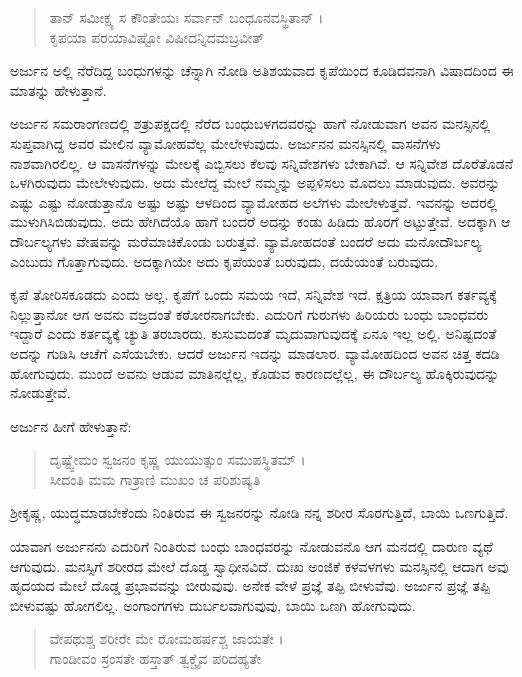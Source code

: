 \begin{verse}
ತಾನ್ ಸಮೀಕ್ಷ್ಯ ಸ ಕೌಂತೇಯಃ ಸರ್ವಾನ್ ಬಂಧೂನವಸ್ಥಿತಾನ್ ।\\ಕೃಪಯಾ ಪರಯಾವಿಷ್ಟೋ ವಿಷೀದನ್ನಿದಮಬ್ರವೀತ್
\end{verse}

{\small ಅರ್ಜುನ ಅಲ್ಲಿ ನೆರೆದಿದ್ದ ಬಂಧುಗಳನ್ನು ಚೆನ್ನಾಗಿ ನೋಡಿ ಅತಿಶಯವಾದ ಕೃಪೆಯಿಂದ ಕೂಡಿದವನಾಗಿ ವಿಷಾದದಿಂದ ಈ ಮಾತನ್ನು ಹೇಳುತ್ತಾನೆ.}

ಅರ್ಜುನ ಸಮರಾಂಗಣದಲ್ಲಿ ಶತ್ರುಪಕ್ಷದಲ್ಲಿ ನೆರೆದ ಬಂಧುಬಳಗದವರನ್ನು ಹಾಗೆ ನೋಡುವಾಗ ಅವನ ಮನಸ್ಸಿನಲ್ಲಿ ಸುಪ್ತವಾಗಿದ್ದ ಅವರ ಮೇಲಿನ ವ್ಯಾಮೋಹವೆಲ್ಲ ಮೇಲೇಳುವುದು. ಅರ್ಜುನನ ಮನಸ್ಸಿನಲ್ಲಿ ವಾಸನೆಗಳು ನಾಶವಾಗಿರಲಿಲ್ಲ. ಆ ವಾಸನೆಗಳನ್ನು ಮೇಲಕ್ಕೆ ಎಬ್ಬಿಸಲು ಕೆಲವು ಸನ್ನಿವೇಶಗಳು ಬೇಕಾಗಿವೆ. ಆ ಸನ್ನಿವೇಶ ದೊರೆತೊಡನೆ ಒಳಗಿರುವುದು ಮೇಲೇಳುವುದು. ಅದು ಮೇಲೆದ್ದ ಮೇಲೆ ನಮ್ಮನ್ನು ಅಪ್ಪಳಿಸಲು ಮೊದಲು ಮಾಡುವುದು. ಅವರನ್ನು ಎಷ್ಟು ಎಷ್ಟು ನೋಡುತ್ತಾನೊ ಅಷ್ಟು ಅಷ್ಟು ಆಳದಿಂದ ವ್ಯಾಮೋಹದ ಅಲೆಗಳು ಮೇಲೇಳುತ್ತವೆ. ಇವನನ್ನು ಅದರಲ್ಲಿ ಮುಳುಗಿಸಿಬಿಡುವುದು. ಅದು ಹೇಗಿದೆಯೊ ಹಾಗೆ ಬಂದರೆ ಅದನ್ನು ಕಂಡು ಹಿಡಿದು ಹೊರಗೆ ಅಟ್ಟುತ್ತೇವೆ. ಅದಕ್ಕಾಗಿ ಆ ದೌರ್ಬಲ್ಯಗಳು ವೇಷವನ್ನು ಮರೆಮಾಚಿಕೊಂಡು ಬರುತ್ತವೆ. ವ್ಯಾಮೋಹದಂತೆ ಬಂದರೆ ಅದು ಮನೋದೌರ್ಬಲ್ಯ ಎಂಬುದು ಗೊತ್ತಾಗುವುದು. ಅದಕ್ಕಾಗಿಯೇ ಅದು ಕೃಪೆಯಂತೆ ಬರುವುದು, ದಯೆಯಂತೆ ಬರುವುದು.

ಕೃಪೆ ತೋರಿಸಕೂಡದು ಎಂದು ಅಲ್ಲ. ಕೃಪೆಗೆ ಒಂದು ಸಮಯ ಇದೆ, ಸನ್ನಿವೇಶ ಇದೆ. ಕ್ಷತ್ರಿಯ ಯಾವಾಗ ಕರ್ತವ್ಯಕ್ಕೆ ನಿಲ್ಲುತ್ತಾನೋ ಆಗ ಅವನು ವಜ್ರದಂತೆ ಕಠೋರನಾಗಬೇಕು. ಎದುರಿಗೆ ಗುರುಗಳು ಹಿರಿಯರು ಬಂಧು ಬಾಂಧವರು ಇದ್ದಾರೆ ಎಂದು ಕರ್ತವ್ಯಕ್ಕೆ ಚ್ಯುತಿ ತರಬಾರದು. ಕುಸುಮದಂತೆ ಮೃದುವಾಗುವುದಕ್ಕೆ ಏನೂ ಇಲ್ಲ ಅಲ್ಲಿ. ಅನಿಷ್ಟದಂತೆ ಅದನ್ನು ಗುಡಿಸಿ ಆಚೆಗೆ ಎಸೆಯಬೇಕು. ಆದರೆ ಅರ್ಜುನ ಇದನ್ನು ಮಾಡಲಾರ. ವ್ಯಾಮೋಹದಿಂದ ಅವನ ಚಿತ್ತ ಕದಡಿ ಹೋಗುವುದು. ಮುಂದೆ ಅವನು ಆಡುವ ಮಾತಿನಲ್ಲೆಲ್ಲ, ಕೊಡುವ ಕಾರಣದಲ್ಲೆಲ್ಲ, ಈ ದೌರ್ಬಲ್ಯ ಹೊಕ್ಕಿರುವುದನ್ನು ನೋಡುತ್ತೇವೆ.

ಅರ್ಜುನ ಹೀಗೆ ಹೇಳುತ್ತಾನೆ:

\begin{verse}
ದೃಷ್ಟ್ವೇಮಂ ಸ್ವಜನಂ ಕೃಷ್ಣ ಯುಯುತ್ಸುಂ ಸಮುಪಸ್ಥಿತಮ್ ।\\ಸೀದಂತಿ ಮಮ ಗಾತ್ರಾಣಿ ಮುಖಂ ಚ ಪರಿಶುಷ್ಯತಿ 
\end{verse}

{\small ಶ್ರೀಕೃಷ್ಣ, ಯುದ್ಧಮಾಡಬೇಕೆಂದು ನಿಂತಿರುವ ಈ ಸ್ವಜನರನ್ನು ನೋಡಿ ನನ್ನ ಶರೀರ ಸೊರಗುತ್ತಿದೆ, ಬಾಯಿ ಒಣಗುತ್ತಿದೆ.}

ಯಾವಾಗ ಅರ್ಜುನನು ಎದುರಿಗೆ ನಿಂತಿರುವ ಬಂಧು ಬಾಂಧವರನ್ನು ನೋಡುವನೊ ಆಗ ಮನದಲ್ಲಿ ದಾರುಣ ವ್ಯಥೆ ಆಗುವುದು. ಮನಸ್ಸಿಗೆ ಶರೀರದ ಮೇಲೆ ದೊಡ್ಡ ಸ್ವಾಧೀನವಿದೆ. ದುಃಖ ಅಂಜಿಕೆ ಕಳವಳಗಳು ಮನಸ್ಸಿನಲ್ಲಿ ಆದಾಗ ಅವು ಹೃದಯದ ಮೇಲೆ ದೊಡ್ಡ ಪ್ರಭಾವವನ್ನು ಬೀರುವುವು. ಅನೇಕ ವೇಳೆ ಪ್ರಜ್ಞೆ ತಪ್ಪಿ ಬೀಳುವೆವು. ಅರ್ಜುನ ಪ್ರಜ್ಞೆ ತಪ್ಪಿ ಬೀಳುವಷ್ಟು ಹೋಗಲಿಲ್ಲ. ಅಂಗಾಂಗಗಳು ದುರ್ಬಲವಾಗುವುವು, ಬಾಯಿ ಒಣಗಿ ಹೋಗುವುದು.

\begin{verse}
ವೇಪಥುಶ್ಚ ಶರೀರೇ ಮೇ ರೋಮಹರ್ಷಶ್ಚ ಜಾಯತೇ ।\\ಗಾಂಡೀವಂ ಸ್ರಂಸತೇ ಹಸ್ತಾತ್ ತ್ವಕ್ಚೈವ ಪರಿದಹ್ಯತೇ
\end{verse}

